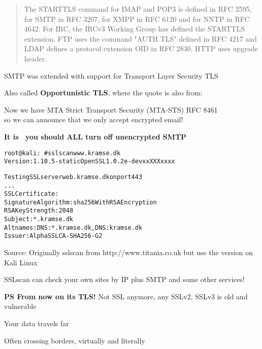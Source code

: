 \documentclass[Screen16to9,17pt]{foils}
\begin{document}

\begin{quote}
The STARTTLS command for IMAP and POP3 is defined in RFC 2595, for SMTP in RFC 3207, for XMPP in RFC 6120 and for NNTP in RFC 4642. For IRC, the IRCv3 Working Group
 has defined the STARTTLS extension. FTP uses the command "AUTH TLS" defined in RFC 4217 and LDAP defines a protocol extension OID in RFC 2830. HTTP uses upgrade header.
\end{quote}

\begin{list1}
\item SMTP was extended with support for Transport Layer Security TLS
\item Also called {\bf Opportunistic TLS}, where the quote is also from:\\ 
\item Now we have MTA Strict Transport Security (MTA-STS) RFC 8461\\
so we can announce that we only accept encrypted email!
\item {\bf It is \the\year\ you should ALL turn off unencrypted SMTP} {\myalert}
\end{list1}







\begin{alltt}\small
root@kali:~# sslscan www.kramse.dk
Version: 1.10.5-static OpenSSL 1.0.2e-dev xx XXX xxxx

Testing SSL server web.kramse.dk on port 443
...
  SSL Certificate:
Signature Algorithm: sha256WithRSAEncryption
RSA Key Strength:    2048
Subject:  *.kramse.dk
Altnames: DNS:*.kramse.dk, DNS:kramse.dk
Issuer:   AlphaSSL CA - SHA256 - G2
\end{alltt}

Source:
Originally sslscan from http://www.titania.co.uk
 but use the version on Kali Linux

SSLscan can check your own sites by IP plus SMTP and some other services!

{\bf
PS From now on its TLS!} Not SSL anymore, any SSLv2, SSLv3 is old and vulnerable





\begin{list2}
\item Your data travels far
\item Often crossing borders, virtually and literally
\end{list2}
\end{document}

